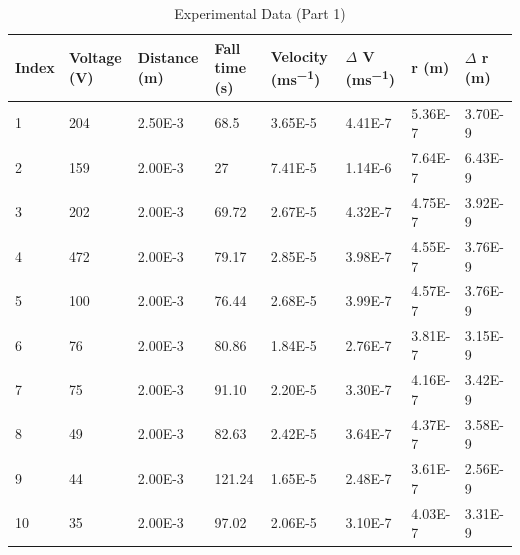 \documentclass{article}
\begin{document}
\begin{table}[h]
\centering
\caption{Experimental Data (Part 1)}
\label{tab:data_part1}
\begin{tabular}{llllllll}
\toprule
\textbf{Index} & \textbf{Voltage (\unit{V})} & \textbf{Distance (\unit{m})} & \textbf{Fall time (\unit{s})} & \textbf{Velocity  (\unit{ms^{-1}})} & \textbf{$\Delta$ V (\unit{ms^{-1}})} & \textbf{r (\unit{m})} & \textbf{$\Delta$ r (\unit{m})}\\
\midrule
1  & 204  & 2.50E-3 & 68.5  & 3.65E-5 & 4.41E-7 & 5.36E-7 & 3.70E-9  \\
2  & 159  & 2.00E-3 & 27    & 7.41E-5 & 1.14E-6 & 7.64E-7 & 6.43E-9 \\
3  & 202  & 2.00E-3 & 69.72 & 2.67E-5 & 4.32E-7 & 4.75E-7 & 3.92E-9  \\
4  & 472  & 2.00E-3 & 79.17 & 2.85E-5 & 3.98E-7 & 4.55E-7 & 3.76E-9 \\
5  & 100  & 2.00E-3 & 76.44 & 2.68E-5 & 3.99E-7 & 4.57E-7 & 3.76E-9 \\
6  & 76   & 2.00E-3 & 80.86 & 1.84E-5 & 2.76E-7 & 3.81E-7 & 3.15E-9 \\
7  & 75   & 2.00E-3 & 91.10 & 2.20E-5 & 3.30E-7 & 4.16E-7 & 3.42E-9 \\
8  & 49   & 2.00E-3 & 82.63 & 2.42E-5 & 3.64E-7 & 4.37E-7 & 3.58E-9 \\
9  & 44   & 2.00E-3 & 121.24 & 1.65E-5 & 2.48E-7 & 3.61E-7 & 2.56E-9 \\
10 & 35   & 2.00E-3 & 97.02 & 2.06E-5 & 3.10E-7 & 4.03E-7 & 3.31E-9 \\
\bottomrule
\end{tabular}
\end{table}
\end{document}
